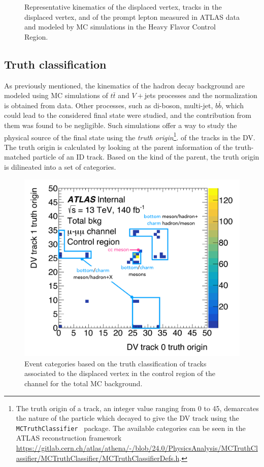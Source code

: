 \begin{figure}[!ht]
    \caption{Representative kinematics of the displaced vertex, tracks in the displaced vertex, and of the prompt lepton measured in ATLAS data and modeled by MC simulations in the \eee Heavy Flavor Control Region.}
    \label{fig:cr_plots_eee}
\end{figure}

\subsection{Truth classification}
As previously mentioned, the kinematics of the hadron decay background are modeled using MC simulations of $t\bar{t}$ and $V+$jets processes and the normalization is obtained from data. Other processes, such as di-boson, multi-jet, $b\bar{b}$, which could lead to the considered final state were studied, and the contribution from them was found to be negligible. Such simulations offer a way to study the physical source of the final state using the \textit{truth origin}\footnote{The truth origin of a track, an integer value ranging from 0 to 45, demarcates the nature of the particle which decayed to give the DV track using the \texttt{MCTruthClassifier}~\cite{mc-truth-web} package. The available categories can be seen in the ATLAS reconstruction framework \url{https://gitlab.cern.ch/atlas/athena/-/blob/24.0/PhysicsAnalysis/MCTruthClassifier/MCTruthClassifier/MCTruthClassifierDefs.h}.}. 
of the tracks in the DV. The truth origin is calculated by looking at the parent information of the truth-matched particle of an ID track. Based on the kind of the parent, the truth origin is dilineated into a set of categories.

\begin{figure}[!ht]
    \centering
    \includegraphics[width=0.66\linewidth]{figures/analysis_strategy/mc_classifier_studies/truth_classification_example.pdf}
    \caption{Event categories based on the truth classification of tracks associated to the displaced vertex in the control region of the \uuu channel for the total MC background.}
    \label{fig:mctruth_groups}
\end{figure}

